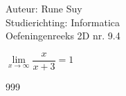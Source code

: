 \documentclass[a4paper]{article}
\newcommand{\limit}{\lim\limits}
\begin{document}
  
\noindent \large Auteur: Rune Suy \\
\noindent \large Studierichting: Informatica\\
\noindent \large Oefeningenreeks 2D nr. 9.4\\

\medskip

\normalsize

$\limit_{x\rightarrow\infty} \dfrac{x}{x+3} = 1$\\

\begin{thebibliography}{999}
\end{thebibliography}
\end{document}
